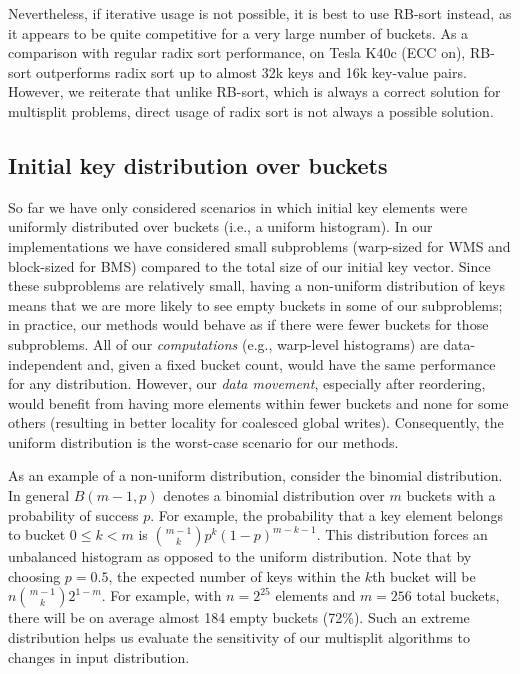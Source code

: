 Nevertheless, if iterative usage is not possible, it is best to use RB-sort instead, as it appears to be quite competitive for a very large number of buckets. As a comparison with regular radix sort performance, on Tesla K40c (ECC on), RB-sort outperforms radix sort up to almost 32k keys and 16k key-value pairs. However, we reiterate that unlike RB-sort, which is always a correct solution for multisplit problems, direct usage of radix sort is not always a possible solution.

\subsection{Initial key distribution over buckets}\label{subsec:perf_distribution}
So far we have only considered scenarios in which initial key elements were uniformly distributed over buckets (i.e., a uniform histogram).
In our implementations we have considered small subproblems (warp-sized for WMS and block-sized for BMS) compared to the total size of our initial key vector.
Since these subproblems are relatively small, having a non-uniform distribution of keys means that we are more likely to see empty buckets in some of our subproblems; in practice, our methods would behave as if there were fewer buckets for those subproblems.
All of our \emph{computations} (e.g., warp-level histograms) are data-independent and, given a fixed bucket count, would have the same performance for any distribution. However, our \emph{data movement}, especially after reordering, would benefit from having more elements within fewer buckets and none for some others (resulting in better locality for coalesced global writes). Consequently, the uniform distribution is the worst-case scenario for our methods.

As an example of a non-uniform distribution, consider the binomial distribution.
In general $B(m-1,p)$ denotes a binomial distribution over $m$ buckets with a probability of success $p$. For example, the probability that a key element belongs to bucket $0\leq k < m$ is $\binom{m-1}{k}p^k {(1-p)}^{m-k-1}$.
This distribution forces an unbalanced histogram as opposed to the uniform distribution.
Note that by choosing $p=0.5$, the expected number of keys within the $k$th bucket will be $n\binom{m-1}{k} 2^{1-m}$.
For example, with $n=2^{25}$ elements and $m=256$ total buckets, there will be on average almost 184 empty buckets (72\%).
Such an extreme distribution helps us evaluate the sensitivity of our multisplit algorithms to changes in input distribution.

